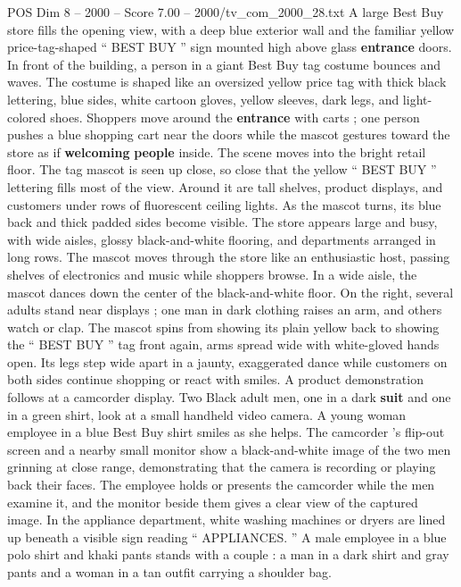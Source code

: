 \begin{textsample}{POS Dim 8 – 2000 – Score 7.00 – 2000/tv\_com\_2000\_28.txt}  \label{ex:f8_pos_016}
A large Best Buy store fills the opening view, with a deep blue exterior wall and the familiar yellow price-tag-shaped “ BEST BUY ” sign mounted high above glass \textbf{entrance} doors.
In front of the building, a person in a giant Best Buy tag costume bounces and waves.
The costume is shaped like an oversized yellow price tag with thick black lettering, blue sides, white cartoon gloves, yellow sleeves, dark legs, and light-colored shoes.
Shoppers move around the \textbf{entrance} with carts ; one person pushes a blue shopping cart near the doors while the mascot gestures toward the store as if \textbf{welcoming} \textbf{people} inside.
The scene moves into the bright retail floor.
The tag mascot is seen up close, so close that the yellow “ BEST BUY ” lettering fills most of the view.
Around it are tall shelves, product displays, and customers under rows of fluorescent ceiling lights.
As the mascot turns, its blue back and thick padded sides become visible.
The store appears large and busy, with wide aisles, glossy black-and-white flooring, and departments arranged in long rows.
The mascot moves through the store like an enthusiastic host, passing shelves of electronics and music while shoppers browse.
In a wide aisle, the mascot dances down the center of the black-and-white floor.
On the right, several adults stand near displays ; one man in dark clothing raises an arm, and others watch or clap.
The mascot spins from showing its plain yellow back to showing the “ BEST BUY ” tag front again, arms spread wide with white-gloved hands open.
Its legs step wide apart in a jaunty, exaggerated dance while customers on both sides continue shopping or react with smiles.
A product demonstration follows at a camcorder display.
Two Black adult men, one in a dark \textbf{suit} and one in a green shirt, look at a small handheld video camera.
A young woman employee in a blue Best Buy shirt smiles as she helps.
The camcorder ’s flip-out screen and a nearby small monitor show a black-and-white image of the two men grinning at close range, demonstrating that the camera is recording or playing back their faces.
The employee holds or presents the camcorder while the men examine it, and the monitor beside them gives a clear view of the captured image.
In the appliance department, white washing machines or dryers are lined up beneath a visible sign reading “ APPLIANCES. ” A male employee in a blue polo shirt and khaki pants stands with a couple : a man in a dark shirt and gray pants and a woman in a tan outfit carrying a shoulder bag.

\end{textsample}

